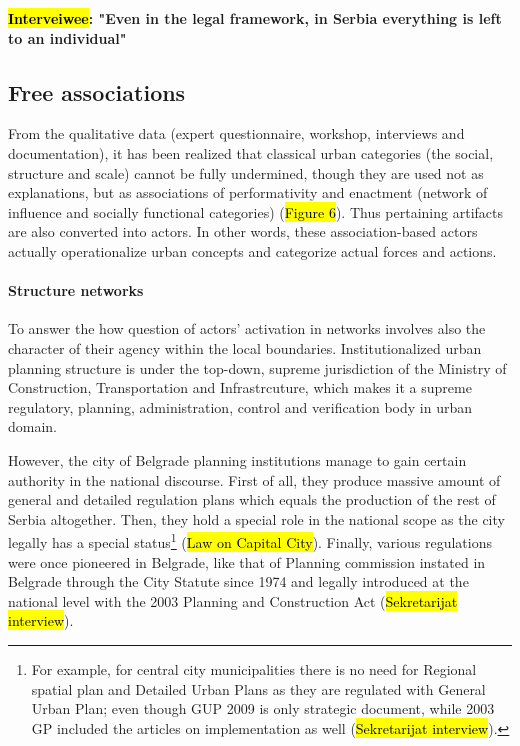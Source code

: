 \documentclass[11pt]{report}
\begin{document}
\textbf{\hl{Interveiwee}:
"Even in the legal framework, in Serbia everything is left to an individual"}

\subsection{Free associations}

From the qualitative data (expert questionnaire, workshop, interviews and documentation), it has been realized that classical urban categories (the social, structure and scale) cannot be fully undermined, though they are used not as explanations, but as associations of performativity and enactment (network of influence and socially functional categories) (\hl{Figure 6}).
Thus pertaining artifacts are also converted into actors.
In other words, these association-based actors actually operationalize urban concepts and categorize actual forces and actions.

\paragraph{Structure networks}

To answer the how question of actors' activation in networks involves also the character of their agency within the local boundaries.
Institutionalized urban planning structure is under the top-down, supreme jurisdiction of the Ministry of Construction, Transportation and Infrastrcuture, which makes it a supreme regulatory, planning, administration, control and verification body in urban domain.

However, the city of Belgrade planning institutions manage to gain certain authority in the national discourse.
First of all, they produce massive amount of general and detailed regulation plans which equals the production of the rest of Serbia altogether.
Then, they hold a special role in the national scope as the city legally has a special status\footnote
{For example, for central city municipalities there is no need for Regional spatial plan and Detailed Urban Plans as they are regulated with General Urban Plan; even though GUP 2009 is only strategic document, while 2003 GP included the articles on implementation as well (\hl{Sekretarijat interview}).}
(\hl{Law on Capital City}).
Finally, various regulations were once pioneered in Belgrade, like that of Planning commission instated in Belgrade through the City Statute since 1974 and legally introduced at the national level with the 2003 Planning and Construction Act (\hl{Sekretarijat interview}).
\end{document}
